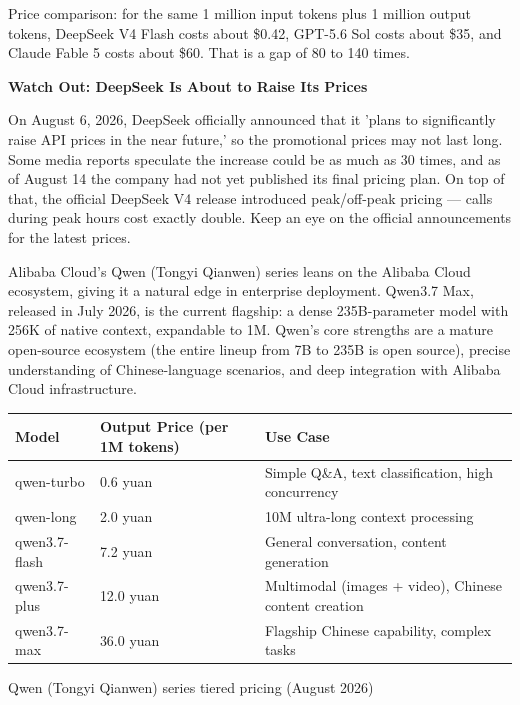 Price comparison: for the same 1 million input tokens plus 1 million output tokens, DeepSeek V4 Flash costs about \$0.42, GPT-5.6 Sol costs about \$35, and Claude Fable 5 costs about \$60. That is a gap of 80 to 140 times.

\textbf{Watch Out: DeepSeek Is About to Raise Its Prices}\par

On August 6, 2026, DeepSeek officially announced that it 'plans to significantly raise API prices in the near future,' so the promotional prices may not last long. Some media reports speculate the increase could be as much as 30 times, and as of August 14 the company had not yet published its final pricing plan. On top of that, the official DeepSeek V4 release introduced peak/off-peak pricing — calls during peak hours cost exactly double. Keep an eye on the official announcements for the latest prices.


Alibaba Cloud's Qwen (Tongyi Qianwen) series leans on the Alibaba Cloud ecosystem, giving it a natural edge in enterprise deployment. Qwen3.7 Max, released in July 2026, is the current flagship: a dense 235B-parameter model with 256K of native context, expandable to 1M. Qwen's core strengths are a mature open-source ecosystem (the entire lineup from 7B to 235B is open source), precise understanding of Chinese-language scenarios, and deep integration with Alibaba Cloud infrastructure.

\begin{center}
\begin{tabularx}{\linewidth}{|X|X|X|}
\hline
\textbf{Model} & \textbf{Output Price (per 1M tokens)} & \textbf{Use Case} \tabularnewline
\hline
qwen-turbo & 0.6 yuan & Simple Q\&A, text classification, high concurrency \tabularnewline
qwen-long & 2.0 yuan & 10M ultra-long context processing \tabularnewline
qwen3.7-flash & 7.2 yuan & General conversation, content generation \tabularnewline
qwen3.7-plus & 12.0 yuan & Multimodal (images + video), Chinese content creation \tabularnewline
qwen3.7-max & 36.0 yuan & Flagship Chinese capability, complex tasks \tabularnewline
\hline
\end{tabularx}
\end{center}

\begin{center}\small\color{gray}Qwen (Tongyi Qianwen) series tiered pricing (August 2026)\end{center}

